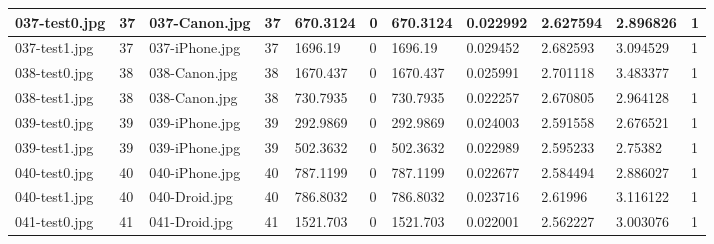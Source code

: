 \begin{landscape}
\begin{longtable}{|p{2cm}|p{1cm}|p{2cm}|p{1cm}|p{2cm}|p{1cm}|p{2cm}|p{2cm}|p{2cm}|p{2cm}|p{1cm}|}
		037-test0.jpg   & 37               & 037-Canon.jpg         & 37                          & 670.3124              & 0                       & 670.3124                   & 0.022992              & 2.627594              & 2.896826                 & 1                \\ \hline
		037-test1.jpg   & 37               & 037-iPhone.jpg        & 37                          & 1696.19               & 0                       & 1696.19                    & 0.029452              & 2.682593              & 3.094529                 & 1                \\ \hline
		038-test0.jpg   & 38               & 038-Canon.jpg         & 38                          & 1670.437              & 0                       & 1670.437                   & 0.025991              & 2.701118              & 3.483377                 & 1                \\ \hline
		038-test1.jpg   & 38               & 038-Canon.jpg         & 38                          & 730.7935              & 0                       & 730.7935                   & 0.022257              & 2.670805              & 2.964128                 & 1                \\ \hline
		039-test0.jpg   & 39               & 039-iPhone.jpg        & 39                          & 292.9869              & 0                       & 292.9869                   & 0.024003              & 2.591558              & 2.676521                 & 1                \\ \hline
		039-test1.jpg   & 39               & 039-iPhone.jpg        & 39                          & 502.3632              & 0                       & 502.3632                   & 0.022989              & 2.595233              & 2.75382                  & 1                \\ \hline
		040-test0.jpg   & 40               & 040-iPhone.jpg        & 40                          & 787.1199              & 0                       & 787.1199                   & 0.022677              & 2.584494              & 2.886027                 & 1                \\ \hline
		040-test1.jpg   & 40               & 040-Droid.jpg         & 40                          & 786.8032              & 0                       & 786.8032                   & 0.023716              & 2.61996               & 3.116122                 & 1                \\ \hline
		041-test0.jpg   & 41               & 041-Droid.jpg         & 41                          & 1521.703              & 0                       & 1521.703                   & 0.022001              & 2.562227              & 3.003076                 & 1                \\ \hline

\end{longtable}
\end{landscape}
